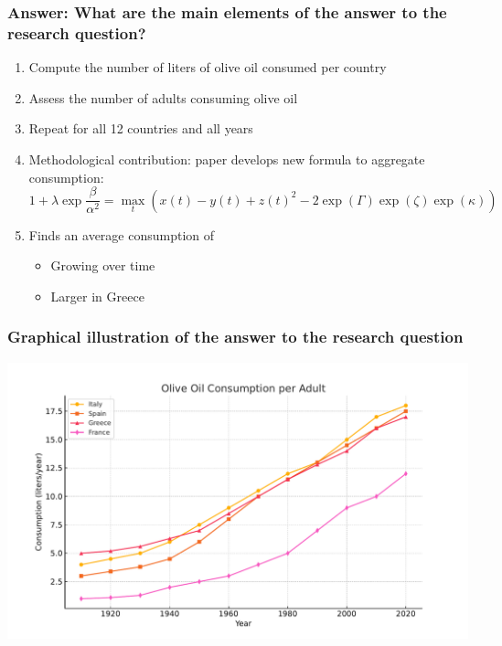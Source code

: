 \documentclass[11pt,xcolor={dvipsnames},hyperref={pdftex,pdfpagemode=UseNone,hidelinks,pdfdisplaydoctitle=true},usepdftitle=false]{beamer}
\begin{document}
\begin{frame}
\frametitle{Answer: What are the main elements of the answer to the research question?}
\begin{enumerate}
\item Compute the number of liters of olive oil consumed per country
\item Assess the number of adults consuming olive oil
\item Repeat for all 12 countries and all years
\item Methodological contribution: paper develops new formula to aggregate consumption:
\begin{equation*}
1+\lambda\exp{\frac{\beta}{\alpha^2}} = \max_{t}\left(x(t)-y(t)+z(t)^2 - 2\exp(\Gamma)\exp(\zeta)\exp(\kappa)\right)
\end{equation*}
\item Finds an average consumption of 
\begin{itemize}
\item Growing over time
\item Larger in Greece
\end{itemize}
\end{enumerate}	
\end{frame}

\begin{frame}
\frametitle{Graphical illustration of the answer to the research question}
\includegraphics[scale=0.5]{olive.pdf}%
\end{frame}
\end{document}
